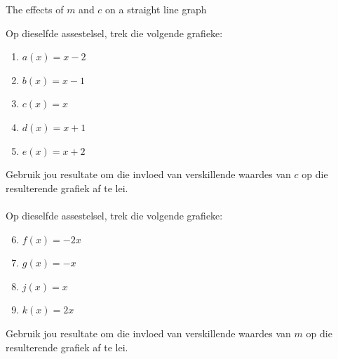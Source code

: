 \begin{Investigation}{The effects of $m$ and $c$ on a straight line graph}

Op dieselfde assestelsel, trek die volgende grafieke:
\begin{enumerate}[noitemsep, label=\textbf{\arabic*}. ] 

    \item $a(x)=x-2$
    \item $b(x)=x-1$
    \item $c(x)=x$
    \item $d(x)=x+1$
    \item $e(x)=x+2$
    \end{enumerate}
Gebruik jou resultate om die invloed van verskillende waardes van $c$ op die resulterende grafiek af te lei.\\
\\

Op dieselfde assestelsel, trek die volgende grafieke:

    \begin{enumerate}[noitemsep, label=\textbf{\arabic*}. ] 
\setcounter{enumi}{5}
    \item $f(x)=-2x$
    \item $g(x)=-x$
    \item $j(x)=x$
\item $k(x)=2x$
    \end{enumerate}
Gebruik jou resultate om die invloed van verskillende waardes van $m$ op die resulterende grafiek af te lei.
\end{Investigation}


